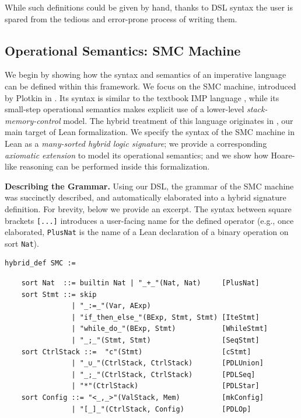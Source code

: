 \documentclass{easychair}
\theoremstyle{remark}
\begin{document}
While such definitions could be given by hand, thanks to DSL syntax the user is spared from the tedious and error-prone process of writing them.


\subsection{Operational Semantics: SMC Machine}\label{operational}
We begin by showing how the syntax and semantics of an imperative language can be defined within this framework. We focus on the SMC machine, introduced by Plotkin in \cite{plotkin}. Its syntax is similar to the textbook IMP language \cite{winskel1993formal}, while its small-step operational semantics makes explicit use of a lower-level \textit{stack-memory-control} model. The hybrid treatment of this language originates in \cite{tableaux}, our main target of Lean formalization. We specify the syntax of the SMC machine in Lean as a \textit{many-sorted hybrid logic signature}; we provide a corresponding \textit{axiomatic extension} to model its operational semantics; and we show how Hoare-like reasoning can be performed inside this formalization.

{\bf Describing the Grammar.} Using our DSL, the grammar of the SMC machine was succinctly described, and automatically elaborated into a hybrid signature definition. For brevity, below we provide an excerpt. The syntax between square brackets \lstinline{[...]} introduces a user-facing name for the defined operator (e.g., once elaborated, \lstinline{PlusNat} is the name of a Lean declaration of a binary operation on sort \lstinline{Nat}).

\begin{lstlisting}
hybrid_def SMC :=
\end{lstlisting}
\vspace{-4mm}
\begin{lstlisting}
    sort Nat  ::= builtin Nat | "_+_"(Nat, Nat)     [PlusNat]
    sort Stmt ::= skip
                | "_:=_"(Var, AExp)
                | "if_then_else_"(BExp, Stmt, Stmt) [IteStmt]
                | "while_do_"(BExp, Stmt)           [WhileStmt]
                | "_;_"(Stmt, Stmt)                 [SeqStmt]
    sort CtrlStack ::=  "c"(Stmt)                   [cStmt]
                | "_∪_"(CtrlStack, CtrlStack)       [PDLUnion]
                | "_;_"(CtrlStack, CtrlStack)       [PDLSeq]
                | "*"(CtrlStack)                    [PDLStar]
    sort Config ::= "<_,_>"(ValStack, Mem)          [mkConfig]
                | "[_]_"(CtrlStack, Config)         [PDLOp]
\end{lstlisting}
\end{document}
